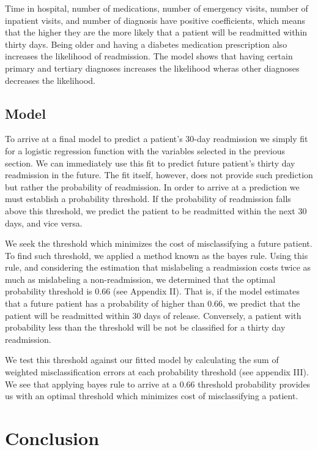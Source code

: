 \documentclass{article}
\begin{document}
Time in hospital, number of medications, number of emergency visits, number of inpatient visits, and number of diagnosis have positive coefficients, which means that the higher they are the more likely that a patient will be readmitted within thirty days. Being older and having a diabetes medication prescription also increases the likelihood of readmission. The model shows that having certain primary and tertiary diagnoses increases the likelihood wheras other diagnoses decreases the likelihood. 

\subsection{Model}

To arrive at a final model to predict a patient's 30-day readmission we simply fit for a logistic regression function with the variables selected in the previous section. We can immediately use this fit to predict future patient's thirty day readmission in the future. The fit itself, however, does not provide such prediction but rather the probability of readmission. In order to arrive at a prediction we must establish a probability threshold. If the probability of readmission falls above this threshold, we predict the patient to be readmitted within the next 30 days, and vice versa. \newline

We seek the threshold which minimizes the cost of misclassifying a future patient. To find such threshold, we applied a method known as the bayes rule. Using this rule, and considering the estimation that mislabeling a readmission costs twice as much as mislabeling a non-readmission, we determined that the optimal probability threshold is 0.66 (see Appendix II). That is, if the model estimates that a future patient has a probability of higher than 0.66, we predict that the patient will be readmitted within 30 days of release. Conversely, a patient with probability less than the threshold will be not be classified for a thirty day readmission. \newline

We test this threshold against our fitted model by calculating the sum of weighted misclassification errors at each probability threshold (see appendix III). We see that applying bayes rule to arrive at a 0.66 threshold probability provides us with an optimal threshold which minimizes cost of misclassifying a patient.

\section{Conclusion}
\end{document}
